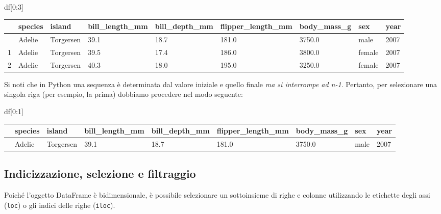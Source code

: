 \documentclass[
  letterpaper,
  krantz2]{{[}./krantz{]}}
\newenvironment{Shaded}{\begin{snugshade}}{\end{snugshade}}
\newcommand{\DecValTok}[1]{\textcolor[rgb]{0.68,0.00,0.00}{#1}}
\newcommand{\NormalTok}[1]{\textcolor[rgb]{0.00,0.23,0.31}{#1}}
\begin{document}
\begin{Shaded}
\begin{Highlighting}[]
\NormalTok{df[}\DecValTok{0}\NormalTok{:}\DecValTok{3}\NormalTok{]}
\end{Highlighting}
\end{Shaded}

\begin{longtable}[]{@{}lllllllll@{}}
\toprule\noalign{}
& species & island & bill\_length\_mm & bill\_depth\_mm &
flipper\_length\_mm & body\_mass\_g & sex & year \\
\midrule\noalign{}
\endhead
\bottomrule\noalign{}
\endlastfoot
0 & Adelie & Torgersen & 39.1 & 18.7 & 181.0 & 3750.0 & male & 2007 \\
1 & Adelie & Torgersen & 39.5 & 17.4 & 186.0 & 3800.0 & female & 2007 \\
2 & Adelie & Torgersen & 40.3 & 18.0 & 195.0 & 3250.0 & female & 2007 \\
\end{longtable}

Si noti che in Python una sequenza è determinata dal valore iniziale e
quello finale \emph{ma si interrompe ad n-1}. Pertanto, per selezionare
una singola riga (per esempio, la prima) dobbiamo procedere nel modo
seguente:

\begin{Shaded}
\begin{Highlighting}[]
\NormalTok{df[}\DecValTok{0}\NormalTok{:}\DecValTok{1}\NormalTok{]}
\end{Highlighting}
\end{Shaded}

\begin{longtable}[]{@{}lllllllll@{}}
\toprule\noalign{}
& species & island & bill\_length\_mm & bill\_depth\_mm &
flipper\_length\_mm & body\_mass\_g & sex & year \\
\midrule\noalign{}
\endhead
\bottomrule\noalign{}
\endlastfoot
0 & Adelie & Torgersen & 39.1 & 18.7 & 181.0 & 3750.0 & male & 2007 \\
\end{longtable}

\subsection{Indicizzazione, selezione e
filtraggio}\label{indicizzazione-selezione-e-filtraggio}

Poiché l'oggetto DataFrame è bidimensionale, è possibile selezionare un
sottoinsieme di righe e colonne utilizzando le etichette degli assi
(\texttt{loc}) o gli indici delle righe (\texttt{iloc}).
\end{document}
